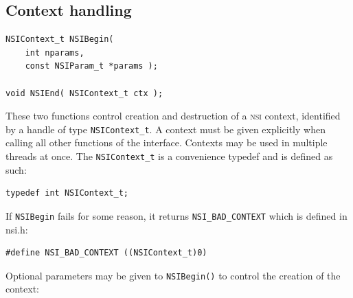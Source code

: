 \documentclass[oneside,ebook]{memoir}
\newcommand*{\acronym}[1]{\textsc{\lowercase{#1}}}
\begin{document}
\subsection{Context handling}
\label{CAPI:contexthandling}
\begin{lstlisting}[style=CAPI]
NSIContext_t NSIBegin(
	int nparams,
	const NSIParam_t *params );

void NSIEnd( NSIContext_t ctx );
\end{lstlisting}
These two functions control creation and destruction of a \acronym{NSI} context, identified by a handle of type \lstinline|NSIContext_t|. A context must be given explicitly when calling all other functions of the interface. Contexts may be used in multiple threads at once. The \lstinline|NSIContext_t| is a convenience typedef and is defined as such:
\begin{lstlisting}[style=CAPI]
typedef int NSIContext_t;
\end{lstlisting}
If \lstinline|NSIBegin| fails for some reason, it returns \lstinline|NSI_BAD_CONTEXT| which is defined in nsi.h:
\begin{lstlisting}[style=CAPI]
#define NSI_BAD_CONTEXT ((NSIContext_t)0)
\end{lstlisting}
Optional parameters may be given to \lstinline|NSIBegin()| to control the creation of the context:
\end{document}
